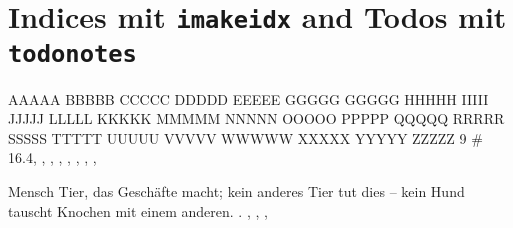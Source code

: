 \chapter{Indices mit \texttt{imakeidx} and Todos mit \texttt{todonotes}}%
\label{chap:IndicesTodos}%
AAAAA
BBBBB
CCCCC
DDDDD
EEEEE
GGGGG
GGGGG
HHHHH
IIIII
JJJJJ
LLLLL
KKKKK
MMMMM
NNNNN
OOOOO
PPPPP
QQQQQ
RRRRR
SSSSS
TTTTT
UUUUU
VVVVV
WWWWW
XXXXX
YYYYY
ZZZZZ
9
\#\index{\#} \num{16.4}, , , 
\index{\LaTeX}, %
, %
, ,  
, \index{+!}%

 Mensch   Tier, das Geschäfte macht; kein anderes Tier tut dies -- kein Hund tauscht Knochen mit einem anderen. \cite{LabenbacherTeX}. , , , %


